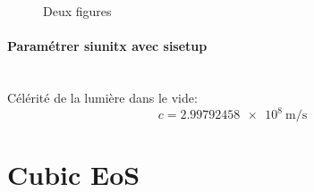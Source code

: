 				\lipsum[66]


				\begin{figure}
					\centering
					\caption{Deux figures}
					\label{fig:deux_figures}
				\end{figure}

			\paragraph{Paramétrer siunitx avec sisetup}~~\\
			
        		Célérité de la lumière dans le vide: $$c=\SI{2.99792458e8}{\meter\per\second}$$
\section{Cubic EoS}
